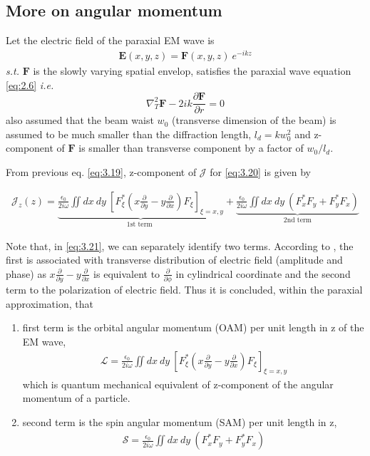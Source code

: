 \documentclass[11pt,a4paper]{article}
\numberwithin{equation}{section}
\begin{document}
\subsection{More on angular momentum}
Let the electric field of the paraxial EM wave is \cite{WO} 
\begin{align}
	\boldsymbol{E}(x,y,z)=\boldsymbol{F}(x,y,z)\:e^{-ikz} \label{eq:3.20}
\end{align}
\textit{s.t.} $\boldsymbol{F}$ is the slowly varying spatial envelop, satisfies the paraxial wave equation \ref{eq:2.6} \textit{i.e.}
$$\nabla_T ^2\boldsymbol{F} -2ik \frac{\partial\boldsymbol{F}}{\partial r}=0$$
also assumed that the beam waist $w_0$ (transverse dimension of the beam) is
assumed to be much smaller than the diffraction length, $l_d = kw_0^2$ and z- component of $\boldsymbol{F}$ is smaller than transverse component by a factor of $w_0/l_d$. \cite{melvin 75}\cite{enk nien 92}\cite{WO}

From previous eq. \ref{eq:3.19}, z-component of $\mathcal{J}$ for \ref{eq:3.20} is given by

\begin{align}
	\mathcal{J}_z (z)
	= \underbrace{\frac{\epsilon_0}{2i\omega} \iint dx\:dy\:\left[F_\xi^\ast\left(x\frac{\partial}{\partial y} - y\frac{\partial}{\partial x}\right)F_\xi\right]_{\xi=x,y}}_{\text{1st term }}
	+\underbrace{\frac{\epsilon_0}{2i\omega}\iint dx\:dy\: (F_x^\ast F_y + F_y^\ast F_x)}_{\text{2nd term}} \label{eq:3.21}
\end{align}

Note that, in \ref{eq:3.21}, we can separately identify two terms. According to \cite{WO}, the first is associated with transverse distribution of electric field (amplitude and phase) as 
$x\frac{\partial}{\partial y} - y\frac{\partial}{\partial x}$
is equivalent to $\frac{\partial}{\partial\phi}$ in cylindrical coordinate and the second term to the polarization of electric field. Thus it is concluded,\cite{enk nien 92} within the paraxial approximation, that
\begin{enumerate}
	\item 
	first term is the orbital angular momentum (OAM) per unit length in z of the EM wave,
	\begin{align}
		\mathcal{L} = \frac{\epsilon_0}{2i\omega} \iint dx\:dy\:\left[F_\xi^\ast\left(x\frac{\partial}{\partial y} - y\frac{\partial}{\partial x}\right)F_\xi\right]_{\xi=x,y} \label{eq:3.22}
	\end{align}
	which is quantum mechanical equivalent of z-component of the angular momentum of a particle.
	
	\item 
	second term is the spin angular momentum (SAM) per unit length in z,
	\begin{align}
		\mathcal{S} = \frac{\epsilon_0}{2i\omega}\iint dx\:dy\: (F_x^\ast F_y + F_y^\ast F_x) \label{eq:3.23}
	\end{align}
\end{enumerate}
\end{document}
